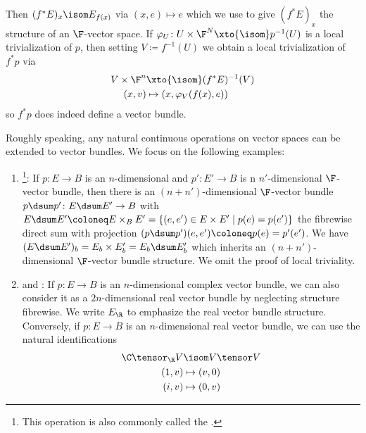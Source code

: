 \begin{definition}
\begin{enumerate}
\begin{equation*}
			\end{equation*}
			Then $(f^* E)_x \isom E_{f(x)}$ via $(x, e) \mapsto e$ which we use to give $(f^* E)_x$ the structure of an $\F$-vector space.
			If $\varphi_U\colon U \times \F^N \xto{\isom} p^{-1}(U)$ is a local trivialization of $p$, then setting $V \coloneq f^{-1}(U)$ we obtain a local trivialization of $f^* p$ via
			\begin{align*}
				V \times \F^n &\xto{\isom} (f^* E)^{-1}(V) \\
				(x, v) &\mapsto (x, \varphi_V(f(x), e))
			\end{align*}
			so $f^* p$ does indeed define a vector bundle.
	\end{enumerate}
	Roughly speaking, any natural continuous operations on vector spaces can be extended to vector bundles.
	We focus on the following examples:
	\begin{enumerate}[resume]
		\item {}\footnote{This operation is also commonly called the .}:
			If $p\colon E \to B$ is an $n$-dimensional and $p'\colon E' \to B$ is n $n'$-dimensional $\F$-vector bundle, then there is an $(n + n')$-dimensional $\F$-vector bundle $p \dsum p'\colon E \dsum E' \to B$ with $E \dsum E' \coloneq E \times_B E' = \{(e, e') \in E \times E' \mid p(e) = p(e')\}$ the fibrewise direct sum with projection $(p \dsum p')(e, e') \coloneq p(e) = p'(e')$.
			We have $(E \dsum E')_b = E_b \times E'_b = E_b \dsum E'_b$ which inherits an $(n + n')$-dimensional $\F$-vector bundle structure.
			We omit the proof of local triviality.
		\item {} and :
			If $p\colon E \to B$ is an $n$-dimensional complex vector bundle, we can also consider it as a $2n$-dimensional real vector bundle by neglecting structure fibrewise.
			We write $E_{\R}$ to emphasize the real vector bundle structure.
			Conversely, if $p\colon E \to B$ is an $n$-dimensional real vector bundle, we can use the natural identifications
			\begin{align*}
				\C \tensor_{\R} V &\isom V \tensor V \\
				(1, v) &\mapsto (v, 0) \\
				(i, v) &\mapsto (0, v)

\end{align*}
\end{enumerate}
\end{definition}
